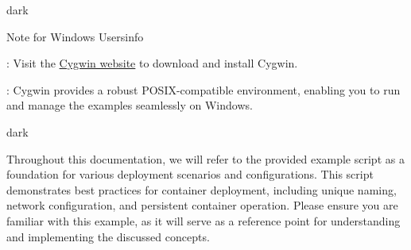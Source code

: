 \begin{baseBoxThree}{}{dark}
    \label{Note for Windows Users}
    \begin{baseBoxThree}{Note for Windows Users}{info}
        \begin{posnexItemize}
            \item[\sA] : Visit the \href{https://www.cygwin.com/}{Cygwin website} to download and install Cygwin.
            \item[\sA] : Cygwin provides a robust POSIX-compatible environment, enabling you to run and manage the examples seamlessly on Windows.
        \end{posnexItemize}
    \end{baseBoxThree}
    \bigskip
    \begin{baseBoxThree}{}{dark}
    \end{baseBoxThree}
    \bigskip
    Throughout this documentation, we will refer to the provided example script as a foundation for various deployment scenarios and configurations. This script demonstrates best practices for container deployment, including unique naming, network configuration, and persistent container operation. Please ensure you are familiar with this example, as it will serve as a reference point for understanding and implementing the discussed concepts.
    \smallskip
\end{baseBoxThree}

